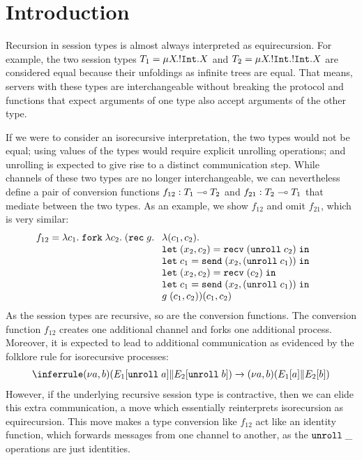 
\section{Introduction}
\label{sec:introduction}

Recursion in session types is almost always interpreted as
equirecursion. For example, the two session types $T_1 = \mu X\!.{{}!\mathtt{Int}.X} $
and $T_2 = \mu X\!.{{}!\mathtt{Int}.{}!\mathtt{Int}.X} $ are considered equal because
their unfoldings as infinite trees are equal. That means, servers with
these types are interchangeable without breaking the protocol and
functions that expect arguments of one type also accept arguments of
the other type.

If we were to consider an isorecursive interpretation, the two types
would not be equal; using values of the types would require explicit
unrolling operations; and unrolling is expected to give rise to a distinct communication
step. While channels of these two types are no longer
interchangeable, we can nevertheless define a pair of conversion
functions
$f_{12} : T_1 \multimap T_2$
and
$f_{21} : T_2 \multimap T_1$
that mediate between the two types. As an example, we show $f_{12}$
and omit $f_{21}$, which is very similar:
\begin{align*}
  f_{12} &=       \ELam {c_1} \EFork{ \ELam {c_2} (\ERec g %
      \begin{array}[t]{l}
      \ELam{(c_1, c_2)} \\
      \ELet{(x_2,c_2)}{\ERecv{(\EUnroll{c_2})}} \\
      \ELet{c_1}{\ESend{x_2}{(\EUnroll{c_1})}} \\
      \ELet{(x_2,c_2)}{\ERecv{({c_2})}} \\
      \ELet{c_1}{\ESend{x_2}{(\EUnroll{c_1})}} \\
        g \; ({c_1}, {c_2})) (c_1, c_2) %
      \end{array}}
\end{align*}
As the session types are recursive, so are the conversion
functions. The conversion function $f_{12}$ creates one additional
channel and forks one additional process. Moreover, it is expected to
lead to additional communication as evidenced by the folklore rule for
isorecursive processes:
\begin{gather}
  \label{eq:3}
  \reducerule{
    \PScope (\PPar* {\EUnroll a} {\EUnroll b})
  }{
    \PScope (\PPar* a b)
  }
\end{gather}
However, if the underlying recursive session type is contractive, then we can
elide this extra communication, a move which essentially reinterprets
isorecursion as equirecursion.
This move makes a type conversion like $f_{12}$ act like an identity
function, which forwards messages from one channel to another, as the
$\mathtt{unroll}\; \_$ operations are just identities. 


